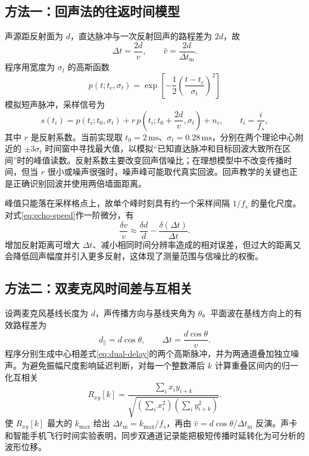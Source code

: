 \documentclass[UTF8,a4paper,zihao=-4]{ctexart}
\begin{document}
\subsection{方法一：回声法的往返时间模型}
声源距反射面为 $d$，直达脉冲与一次反射回声的路程差为 $2d$，故
\begin{equation}
 \Delta t=\frac{2d}{v},\qquad \hat v=\frac{2d}{\Delta t_{\mathrm m}}.
 \label{eq:echo-speed}
\end{equation}
程序用宽度为 $\sigma_t$ 的高斯函数
\begin{equation}
 p(t;t_c,\sigma_t)=\exp\!\left[-\frac12\left(\frac{t-t_c}{\sigma_t}\right)^2\right]
\end{equation}
模拟短声脉冲，采样信号为
\begin{equation}
 s(t_i)=p(t_i;t_0,\sigma_t)
 +r\,p\!\left(t_i;t_0+\frac{2d}{v},\sigma_t\right)+n_i,
 \qquad t_i=\frac{i}{f_s},
 \label{eq:echo-signal}
\end{equation}
其中 $r$ 是反射系数。当前实现取 $t_0=2\,\mathrm{ms}$、$\sigma_t=0.28\,\mathrm{ms}$，分别在两个理论中心附近的 $\pm3\sigma_t$ 时间窗中寻找最大值，以模拟“已知直达脉冲和目标回波大致所在区间”时的峰值读数。反射系数主要改变回声信噪比；在理想模型中不改变传播时间，但当 $r$ 很小或噪声很强时，噪声峰可能取代真实回波。回声教学的关键也正是正确识别回波并使用两倍墙面距离\cite{berg2011}。

峰值只能落在采样格点上，故单个峰时刻具有约一个采样间隔 $1/f_s$ 的量化尺度。对式\eqref{eq:echo-speed}作一阶微分，有
\begin{equation}
 \frac{\delta v}{v}\approx \frac{\delta d}{d}-\frac{\delta(\Delta t)}{\Delta t}.
 \label{eq:echo-uncertainty}
\end{equation}
增加反射距离可增大 $\Delta t$、减小相同时间分辨率造成的相对误差，但过大的距离又会降低回声幅度并引入更多反射，这体现了测量范围与信噪比的权衡。

\subsection{方法二：双麦克风时间差与互相关}
设两麦克风基线长度为 $d$，声传播方向与基线夹角为 $\theta$。平面波在基线方向上的有效路程差为
\begin{equation}
 d_{\parallel}=d\cos\theta,\qquad
 \Delta t=\frac{d\cos\theta}{v}.
 \label{eq:dual-delay}
\end{equation}
程序分别生成中心相差式\eqref{eq:dual-delay}的两个高斯脉冲，并为两通道叠加独立噪声。为避免振幅尺度影响延迟判断，对每一个整数滞后 $k$ 计算重叠区间内的归一化互相关
\begin{equation}
 R_{xy}[k]=
 \frac{\sum_i x_i y_{i+k}}
 {\sqrt{\left(\sum_i x_i^2\right)\left(\sum_i y_{i+k}^2\right)}}.
 \label{eq:dual-correlation}
\end{equation}
使 $R_{xy}[k]$ 最大的 $k_{\max}$ 给出 $\Delta t_{\mathrm m}=k_{\max}/f_s$，再由 $\hat v=d\cos\theta/\Delta t_{\mathrm m}$ 反演。声卡和智能手机飞行时间实验表明，同步双通道记录能把极短传播时延转化为可分析的波形位移\cite{carvalho2007,staacks2018}。
\end{document}
